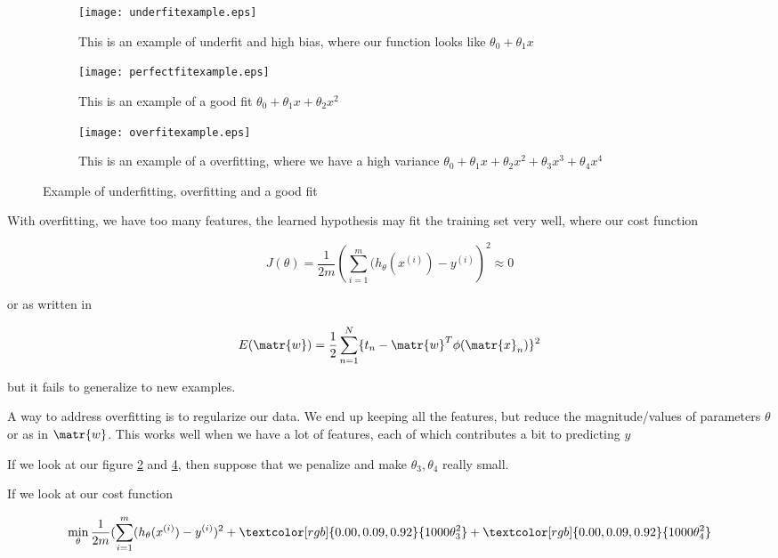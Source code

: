 \begin{figure}[H]
  \centering
  \begin{subfigure}{0.33\textwidth}
    \centering
    \texttt{[image: underfitexample.eps]}
    \caption{This is an example of underfit and high bias, where our function looks like $\theta_0 + \theta_1x$}
    \label{fig:app:underfittingexample}
  \end{subfigure}
  \begin{subfigure}{0.33\textwidth}
    \centering
    \texttt{[image: perfectfitexample.eps]}
    \caption{This is an example of a good fit $\theta_0 + \theta_1x + \theta_2x^2$}
    \label{fig:app:perfectfitexample}
  \end{subfigure}
  \begin{subfigure}{0.33\textwidth}
    \centering
    \texttt{[image: overfitexample.eps]}
    \caption{This is an example of a overfitting, where we have a high variance $\theta_0 + \theta_1x + \theta_2x^2 + \theta_3x^3 + \theta_4x^4$}
    \label{fig:app:overfittingexample}
  \end{subfigure}
  \caption{Example of underfitting, overfitting and a good fit}
\end{figure}

With overfitting, we have too many features, the learned hypothesis may fit the training set very well, where our cost function

\[
  J(\theta) = \frac{1}{2m}\left(\sum_{i=1}^{m}(h_\theta(x^{(i)})-y^{(i)}\right)^2 \approx 0
\]

or as written in \cite{bishop2006pattern}

\[
  E(\matr{w}) = \frac{1}{2}\sum_{n=1}^{N}\{t_n - \matr{w}^T\phi(\matr{x}_n)\}^2
\]

but it fails to generalize to new examples.

A way to address overfitting is to regularize our data. We end up keeping all the features, but reduce the magnitude/values of parameters $\theta$ or as in \cite{bishop2006pattern} $\matr{w}$. This works well when we have a lot of features, each of which contributes a bit to predicting $y$

If we look at our figure \ref{fig:app:perfectfitexample} and \ref{fig:app:overfittingexample}, then suppose that we penalize and make $\theta_3,\theta_4$ really small.

If we look at our cost function

\[
  \min_\theta \frac{1}{2m}(\sum_{i=1}^{m}(h_\theta(x^{(i)})-y^{(i)})^2 + \textcolor[rgb]{0.00,0.09,0.92}{1000\theta^2_3} + \textcolor[rgb]{0.00,0.09,0.92}{1000\theta^2_4}
\]


